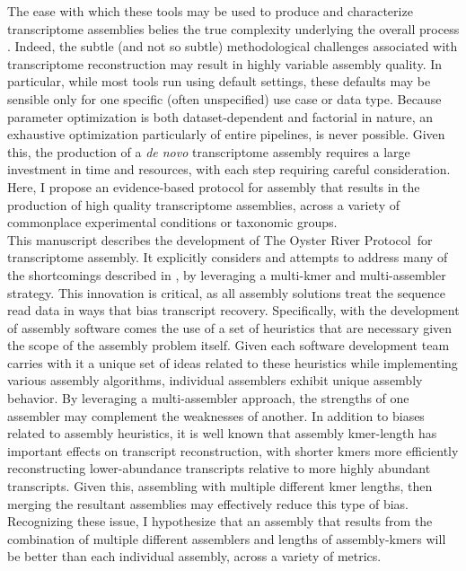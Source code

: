 \documentclass[10pt,letterpaper]{article}
\newcommand{\tit}{\textit}
\begin{document}
The ease with which these tools may be used to produce and characterize transcriptome assemblies belies the true complexity underlying the overall process \citep{Ungaro:2017kf, Wang:2017gc, Moreton:2015fw, Yang:2013iz}. Indeed, the subtle (and not so subtle) methodological challenges associated with transcriptome reconstruction may result in highly variable assembly quality. In particular, while most tools run using default settings, these defaults may be sensible only for one specific (often unspecified) use case or data type. Because parameter optimization is both dataset-dependent and factorial in nature, an exhaustive optimization particularly of entire pipelines, is never possible. Given this, the production of a \tit{de novo} transcriptome assembly requires a large investment in time and resources, with each step requiring careful consideration. Here, I propose an evidence-based protocol for assembly that results in the production of high quality transcriptome assemblies, across a variety of commonplace experimental conditions or taxonomic groups. \\

This manuscript describes the development of The Oyster River Protocol\footnotemark\ for transcriptome assembly. It explicitly considers and attempts to address many of the shortcomings described in \citep{Vijay:2012gy}, by leveraging a multi-kmer and multi-assembler strategy. This innovation is critical, as all assembly solutions treat the sequence read data in ways that bias transcript recovery. Specifically, with the development of assembly software comes the use of a set of heuristics that are necessary given the scope of the assembly problem itself. Given each software development team carries with it a unique set of ideas related to these heuristics while implementing various assembly algorithms, individual assemblers exhibit unique assembly behavior. By leveraging a multi-assembler approach, the strengths of one assembler may complement the weaknesses of another. In addition to biases related to assembly heuristics, it is well known that assembly kmer-length has important effects on transcript reconstruction, with shorter kmers more efficiently reconstructing lower-abundance transcripts relative to more highly abundant transcripts. Given this, assembling with multiple different kmer lengths, then merging the resultant assemblies may effectively reduce this type of bias. Recognizing these issue, I hypothesize that an assembly that results from the combination of multiple different assemblers and lengths of assembly-kmers will be better than each individual assembly, across a variety of metrics. 
\end{document}
